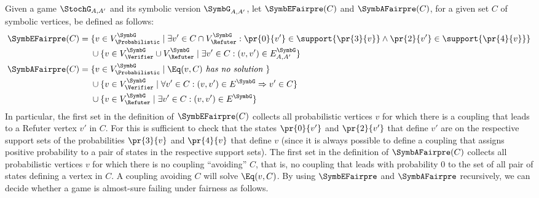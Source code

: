     Given a game $\StochG_{A,A'}$ and its symbolic version $\SymbG_{A,A'}$, let $\SymbEFairpre(C)$ and 
$\SymbAFairpre(C)$, for a given set $C$ of symbolic vertices, be defined as follows:
\begin{align*}
	\SymbEFairpre(C) ={}& \{ v \in V^\SymbG_\Probabilistic \mid  \exists v' \in C\cap V^\SymbG_\Refuter : \pr{0}{v'}\in\support{\pr{3}{v}} \land \pr{2}{v'}\in\support{\pr{4}{v}} \} \\
		       & \cup \{ v \in  V^\SymbG_\Verifier \cup V^\SymbG_\Refuter  \mid \exists v' \in C : (v,v') \in E^\SymbG_{A,A'} \}\\
	\SymbAFairpre(C) = {}&\{ v \in V^\SymbG_\Probabilistic \mid \Eq(v,C) \textit{  has no solution }\} \\
		      & \cup \{ v \in  V^\SymbG_\Verifier   \mid \forall v' \in C : (v,v') \in E^\SymbG \Rightarrow v' \in C \}\\
		      &  \cup \{ v \in  V^\SymbG_\Refuter  \mid \exists v' \in C : (v,v') \in E^\SymbG \}
\end{align*}
%
In particular, the first set in the definition of $\SymbEFairpre(C)$
collects all probabilistic vertices $v$ for which there is a coupling
that leads to a Refuter vertex $v'$ in $C$.  For this is sufficient to
check that the states $\pr{0}{v'}$ and $\pr{2}{v'}$ that define $v'$
are on the respective support sets of the probabilities
$\pr{3}{v}$ and $\pr{4}{v}$ that define $v$ (since
it is always possible to define a coupling that assigns positive
probability to a pair of states in the respective support sets).  The
first set in the definition of $\SymbAFairpre(C)$ collects all
probabilistic vertices $v$ for which there is no coupling ``avoiding'' $C$, that is, no coupling that leads with probability 0 to the set of all
pair of states defining a vertex in $C$.  A coupling avoiding
$C$ will solve $\Eq(v,C)$.
%
By using $\SymbEFairpre$ and $\SymbAFairpre$ recursively, we can
decide whether a game is almost-sure failing under fairness as follows.

